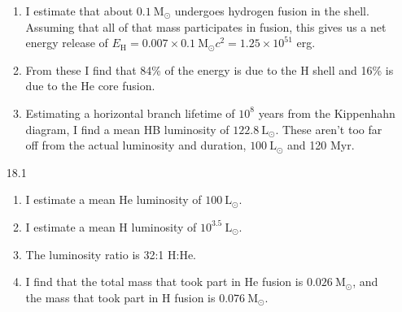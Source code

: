 \documentclass[11pt]{article}
\newcommand\lsol{\mathrm{L}_\odot}
\newcommand\msol{\mathrm{M}_\odot}
\begin{document}
\begin{enumerate}
\begin{enumerate}
    \item I estimate that about $0.1~\msol$ undergoes hydrogen fusion in the shell. Assuming that all of that mass participates in fusion, this gives us a net energy release of $E_\mathrm{H} = 0.007\times 0.1~\msol c^2 = 1.25\times10^{51}$ erg.
    
    \item From these I find that 84\% of the energy is due to the H shell and 16\% is due to the He core fusion.
    
    \item Estimating a horizontal branch lifetime of $10^8$ years from the Kippenhahn diagram, I find a mean HB luminosity of $122.8~\lsol$. These aren't too far off from the actual luminosity and duration, $100~\lsol$ and 120 Myr.
    
    \end{enumerate}
    
\item [18.1]
	\begin{enumerate}
	
    \item I estimate a mean He luminosity of $100~\lsol$.
    
    \item I estimate a mean H luminosity of $10^{3.5}~\lsol$.

    \item The luminosity ratio is 32:1 H:He.

    \item I find that the total mass that took part in He fusion is $0.026~\msol$, and the mass that took part in H fusion is $0.076~\msol$.

    \end{enumerate}

\end{enumerate}
\end{document}
